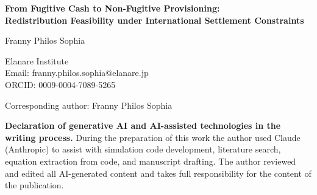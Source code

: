 \documentclass[12pt]{article}
\begin{document}
\begin{center}
{\Large\bfseries From Fugitive Cash to Non-Fugitive Provisioning:\\[4pt]
Redistribution Feasibility under International Settlement Constraints}

\bigskip

{\large Franny Philos Sophia}

\medskip

Elanare Institute\\
Email: franny.philos.sophia@elanare.jp\\
ORCID: 0009-0004-7089-5265

\bigskip

Corresponding author: Franny Philos Sophia

\end{center}

\bigskip

\noindent\textbf{Declaration of generative AI and AI-assisted technologies in the writing process.}
During the preparation of this work the author used Claude (Anthropic)
to assist with simulation code development, literature search, equation
extraction from code, and manuscript drafting. The author reviewed and
edited all AI-generated content and takes full responsibility for the
content of the publication.
\end{document}
